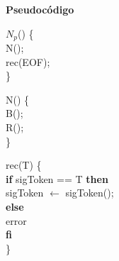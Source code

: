 \documentclass[\main/ApuntesPL.tex]{subfiles}
\begin{document}
    \par
    \textbf{Pseudocódigo}
    \begin{center}
      \begin{minipage}{.2\textwidth}
        $N_p$() \{\\
        \hspace*{5mm}N();\\
        \hspace*{5mm}rec(EOF);\\
        \}
      \end{minipage}%
      \begin{minipage}{.2\textwidth}
        N() \{\\
        \hspace*{5mm}B();\\
        \hspace*{5mm}R();\\
        \}
      \end{minipage}%
      \begin{minipage}{.6\textwidth}
        rec(T) \{\\
        \hspace*{5mm}\textbf{if} sigToken == T \textbf{then}\\
        \hspace*{10mm}sigToken $\leftarrow$ sigToken();\\
        \hspace*{5mm}\textbf{else}\\
        \hspace*{10mm}error\\
        \hspace*{5mm}\textbf{fi}\\
        \}
      \end{minipage}


\end{center}
\end{document}
